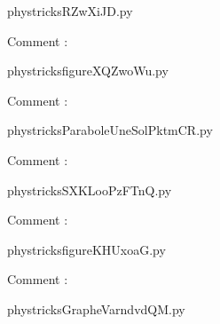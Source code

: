     \newcommand{\CaptionFigRZwXiJD}{<+Type your caption here+>}
    \begin{center}
        
    \end{center}
    phystricksRZwXiJD.py

    Comment : 

    \clearpage
    


    \newcommand{\CaptionFigfigureXQZwoWu}{<+Type your caption here+>}
    \begin{center}
        
    \end{center}
    phystricksfigureXQZwoWu.py

    Comment : 

    \clearpage
    


    \newcommand{\CaptionFigParaboleUneSolPktmCR}{<+Type your caption here+>}
    \begin{center}
        
    \end{center}
    phystricksParaboleUneSolPktmCR.py

    Comment : 

    \clearpage
    


    \newcommand{\CaptionFigSXKLooPzFTnQ}{<+Type your caption here+>}
    \begin{center}
        
    \end{center}
    phystricksSXKLooPzFTnQ.py

    Comment : 

    \clearpage
    


    \newcommand{\CaptionFigfigureKHUxoaG}{<+Type your caption here+>}
    \begin{center}
        
    \end{center}
    phystricksfigureKHUxoaG.py

    Comment : 

    \clearpage
    


    \newcommand{\CaptionFigGrapheVarndvdQM}{<+Type your caption here+>}
    \begin{center}
        
    \end{center}
    phystricksGrapheVarndvdQM.py

